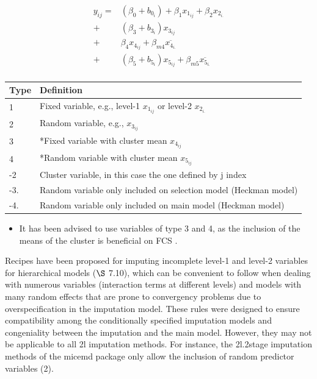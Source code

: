 \documentclass[
  article]{jss}
\providecommand{\tightlist}{%
  \setlength{\itemsep}{0pt}\setlength{\parskip}{0pt}}\usepackage{longtable,booktabs,array}
\begin{document}
\begin{align}
y_{ij} =& (\beta_0 + b_{0_i})+ \beta_1x_{1_{ij}}+\beta_2x_{2_{i.}} \nonumber \\
+& (\beta_3 +  b_{3_i})x_{3_{ij}} \nonumber \\
+& \beta_4x_{4_{ij}} + \beta_{m4}\overline{x_{4_{i.}}}\nonumber \\
+& (\beta_5 +  b_{5_i})x_{5_{ij}} +\beta_{m5}\overline{x_{5_{i.}}}\nonumber \\
\end{align}

\begin{tabular}{ll}
     \toprule
Type & Definition \\
  \midrule
 1  & Fixed variable, e.g., level-1  $x_{1_{ij}}$ or  level-2 $x_{2_{i.}}$ \\
 2  & Random variable, e.g., $x_{3_{ij}}$\\
 3  & *Fixed variable with cluster mean $x_{4_{ij}}$\\
 4  & *Random variable with cluster mean $x_{5_{ij}}$\\
  \midrule
-2  & Cluster variable, in this case the one defined by j index  \\
-3. & Random variable only included on selection model (Heckman model)\\
-4. & Random variable only included on main model (Heckman model)\\
      \bottomrule
\end{tabular}

\begin{itemize}
\tightlist
\item
  It has been advised to use variables of type 3 and 4, as the inclusion
  of the means of the cluster is beneficial on FCS \cite{mistler2017}.
\end{itemize}

Recipes have been proposed for imputing incomplete level-1 and level-2
variables for hierarchical models \cite{buuren2018a} (\(\S\) 7.10),
which can be convenient to follow when dealing with numerous variables
(interaction terms at different levels) and models with many random
effects that are prone to convergency problems due to overspecification
in the imputation model. These rules were designed to ensure
compatibility among the conditionally specified imputation models and
congeniality between the imputation and the main model. However, they
may not be applicable to all 2l imputation methods. For instance, the
2l.2stage imputation methods of the micemd package only allow the
inclusion of random predictor variables (2).
\end{document}
